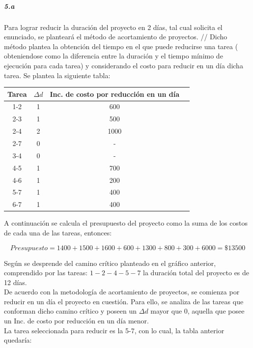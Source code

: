 \documentclass[a4paper,10pt]{article}
\begin{document}
\subparagraph {5.a}
Para lograr reducir la duraci\'on del proyecto en 2 d\'ias, tal cual solicita el enunciado, se plantear\'a el m\'etodo de acortamiento de proyectos. //
Dicho m\'etodo plantea la obtenci\'on del tiempo en el que puede reducirse una tarea ( obteniendose como la diferencia entre la duraci\'on y el tiempo m\'inimo de ejecuci\'on para cada tarea) y 
considerando el costo para reducir en un d\'ia dicha tarea. Se plantea la siguiente tabla:

   \begin{center}
   \begin{tabular}{|| c | c | c | c ||}
   \hline 
      Tarea & $\Delta d$ & Inc. de costo por reducci\'on en un d\'ia \\ \hline \hline
      1-2 & 1 & 600  \\ \hline
      2-3 & 1 & 500  \\ \hline 
      2-4 & 2 & 1000  \\ \hline
      2-7 & 0 & - \\ \hline
      3-4 & 0 & - \\ \hline
      4-5 & 1 & 700 \\ \hline
      4-6 & 1 & 200 \\ \hline
      5-7 & 1 & 400    \\ \hline
      6-7 & 1 & 400\\ \hline
   \end{tabular}
   \end{center}

A continuaci\'on se calcula el presupuesto del proyecto como la suma de los costos de cada una de las tareas, entonces:

$$ Presupuesto = 1400 + 1500 + 1600 + 600 + 1300 + 800 + 300 + 6000 = \$13500$$

Seg\'un se desprende del camino cr\'itico planteado en el gr\'afico anterior, comprendido por las tareas: $1-2-4-5-7$ la duraci\'on total del proyecto es de 12 d\'ias.
\\
De acuerdo con la metodolog\'ia de acortamiento de proyectos, se comienza por reducir en un d\'ia el proyecto en cuesti\'on. Para ello, se analiza de las tareas que conforman dicho camino cr\'itico 
y poseen un $\Delta d$ mayor que 0, aquella que posee un Inc. de costo por reducci\'on en un d\'ia menor.\\

La tarea seleccionada para reducir es la 5-7, con lo cual, la tabla anterior quedar\'ia:
\end{document}
